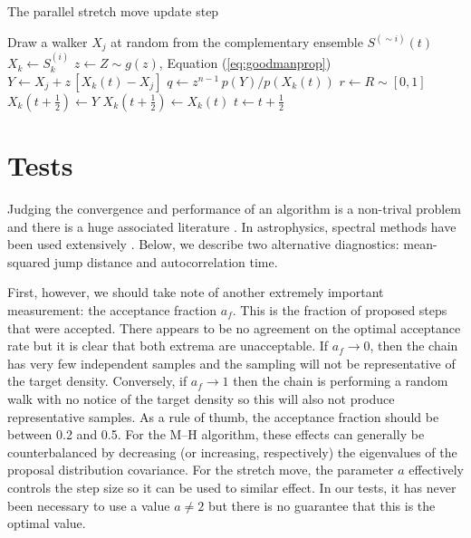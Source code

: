 \documentclass[12pt,preprint]{aastex}
\newcommand{\Eq}[1]{Equation (\ref{eq:#1})}
\newcommand{\eq}[1]{Equation (\ref{eq:#1})}
\newcommand{\sectlabel}[1]{\label{sect:#1}}
\newcommand{\algolabel}[1]{\label{algo:#1}}
\newcommand{\ensemble}{S}
\newcommand{\colorens}[1]{\ensemble^{(#1)}}
\renewcommand{\vector}[1]{#1}
\newcommand{\af}{\ensuremath{a_f}}
\begin{document}
\begin{algorithm}
\caption{The parallel stretch move update step
    \algolabel{parallel}}
\begin{algorithmic}[1]
     \label{line:parallelloop}
        \STATE Draw a walker $\vector{X_j}$ at random from the complementary %
            ensemble $\colorens{\sim i} (t)$
        \STATE $\vector{X_k} \gets \colorens{i}_k$
        \STATE $z \gets Z \sim g(z)$, \Eq{goodmanprop}
        \STATE $\vector{Y} \gets \vector{X_j}
                + z \, [ \vector{X_k} (t) - \vector{X_j}]$
        \STATE $q \gets z^{n-1} \, p(\vector{Y})/p(\vector{X}_k(t))$
        \STATE $r \gets R \sim [0, 1]$
        \IF{$r \ge q$, \eq{acceptance}}
            \STATE $\vector{X_k} (t+\frac{1}{2}) \gets \vector{Y}$
        \ELSE
            \STATE $\vector{X_k} (t+\frac{1}{2}) \gets \vector{X_k}(t)$
        \ENDIF
    \ENDFOR
    \STATE $t \gets t+\frac{1}{2}$
\ENDFOR

\end{algorithmic}
\end{algorithm}

\section{Tests} \sectlabel{tests}

Judging the convergence and performance of an algorithm is a non-trival
problem and there is a huge associated literature
\citep[see, for example,][for a review]{Cowles:1996}. In astrophysics,
spectral methods have been used extensively
\citep[for example][]{Dunkley:2005}. Below, we describe two alternative
diagnostics: mean-squared jump distance and autocorrelation time.

First,
however, we should take note of another extremely important measurement:
the acceptance fraction \af. This is the fraction of proposed steps that were
accepted. There appears to be no agreement on the optimal acceptance rate
but it is clear that both extrema are unacceptable. If $\af \to 0$, then
the chain has very few independent samples and the sampling will not be
representative of the target density. Conversely, if $\af \to 1$ then the
chain is performing a random walk with no notice of the target density so
this will also not produce representative samples. As a rule of thumb, the
acceptance fraction should be between 0.2 and 0.5. For the M--H algorithm,
these effects can generally be counterbalanced by decreasing (or increasing,
respectively) the eigenvalues of the proposal distribution covariance. For
the stretch move, the parameter $a$ effectively controls the step size so
it can be used to similar effect. In our tests, it has never been
necessary to use a value $a \ne 2$ but there is no guarantee that this
is the optimal value.
\end{document}
